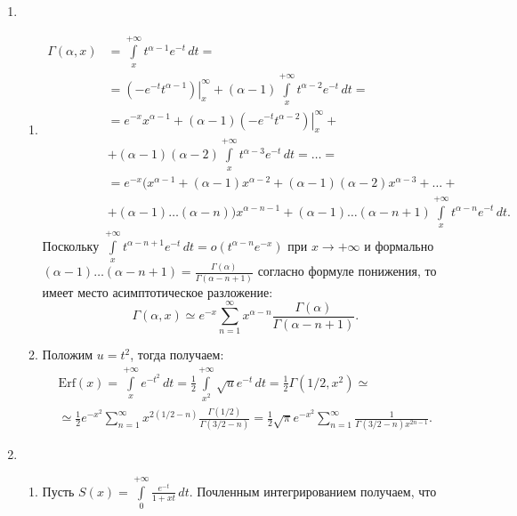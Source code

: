 \documentclass[a4paper]{article}
\begin{document}
\begin{enumerate}
\begin{enumerate}
        \end{enumerate}
  \item \begin{enumerate}
          \item \begin{align*}
          \Gamma(\alpha,x)&=\int\limits_x^{+\infty}\!t^{\alpha-1}e^{-t}\,dt=\\
          &=\left.\left(-e^{-t}t^{\alpha-1}\right)\right|_x^\infty+(\alpha-1)
          \int\limits_x^{+\infty}\!t^{\alpha-2}e^{-t}\,dt=\\
          &=e^{-x}x^{\alpha-1}+(\alpha-1)\left.\left(-e^{-t}t^{\alpha-2}\right)\right|_x^\infty+\\
          &+(\alpha-1)(\alpha-2)\int\limits_x^{+\infty}\!t^{\alpha-3}e^{-t}\,dt=\ldots=\\
          &=e^{-x}(x^{\alpha-1}+(\alpha-1)x^{\alpha-2}+(\alpha-1)(\alpha-2)x^{\alpha-3}+\ldots+\\
          &+(\alpha-1)\ldots(\alpha-n))x^{\alpha-n-1}+(\alpha-1)\ldots(\alpha-n+1)
          \int\limits_x^{+\infty}\!t^{\alpha-n}e^{-t}\,dt.
          \end{align*}
          Поскольку
          $\int\limits_x^{+\infty}\!t^{\alpha-n+1}e^{-t}\,dt=o(t^{\alpha-n}e^{-x})$
          при $x\rightarrow+\infty$ и формально $(\alpha-1)\ldots(\alpha-n+1)=
          \frac{\Gamma(\alpha)}{\Gamma(\alpha-n+1)}$ согласно
          формуле понижения, то имеет место асимптотическое
          разложение: $$\Gamma(\alpha,x)\simeq e^{-x}\sum\limits_{n=1}^\infty
          x^{\alpha-n}\frac{\Gamma(\alpha)}{\Gamma(\alpha-n+1)}.$$
          \item Положим $u=t^2$, тогда получаем:
          \begin{multline*}
          \mathrm{Erf}(x)=\int\limits_x^{+\infty}\!e^{-t^2}\,dt=
          \frac{1}{2}\int\limits_{x^2}^{+\infty}\!\sqrt{u}e^{-t}\,dt=
          \frac{1}{2}\Gamma(1/2, x^2)\simeq\\
          \simeq \frac{1}{2}e^{-x^2}\sum\limits_{n=1}^\infty
          x^{2(1/2-n)}\frac{\Gamma(1/2)}{\Gamma(3/2-n)}=\frac{1}{2}\sqrt{\pi}
          e^{-x^2}\sum\limits_{n=1}^\infty\frac{1}{\Gamma(3/2-n)x^{2n-1}}.
          \end{multline*}
        \end{enumerate}
  \item \begin{enumerate}
          \item Пусть
          $S(x)=\int\limits_0^{+\infty}\!\frac{e^{-t}}{1+xt}\,dt$.
          Почленным интегрированием получаем, что

\end{enumerate}
\end{enumerate}
\end{document}
